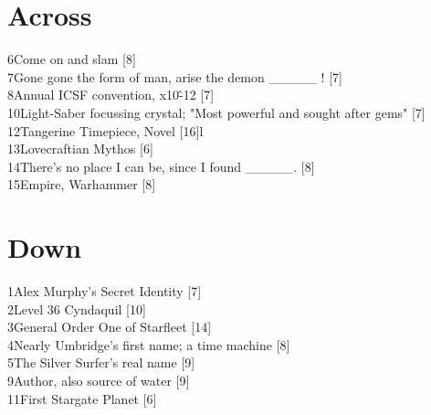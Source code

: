 \begin{multicols}{2}

\section{Across}
6\hspace{5mm}Come on and slam [8]\\
7\hspace{5mm}Gone gone the form of man, arise the demon \_\_\_\_\_ ! [7]\\
8\hspace{5mm}Annual ICSF convention, x10\^-12 [7]\\
10\hspace{5mm}Light-Saber focussing crystal; "Most powerful and sought after gems" [7]\\
12\hspace{5mm}Tangerine Timepiece, Novel [16]l\\
13\hspace{5mm}Lovecraftian Mythos [6]\\
14\hspace{5mm}There's no place I can be, since I found \_\_\_\_\_. [8]\\
15\hspace{5mm}Empire, Warhammer [8]

\section{Down}
1\hspace{5mm}Alex Murphy's Secret Identity [7]\\
2\hspace{5mm}Level 36 Cyndaquil [10]\\
3\hspace{5mm}General Order One of Starfleet [14]\\
4\hspace{5mm}Nearly Umbridge's first name; a time machine [8]\\
5\hspace{5mm}The Silver Surfer's real name [9]\\
9\hspace{5mm}Author, also source of water [9]\\
11\hspace{5mm}First Stargate Planet [6]

\end{multicols}